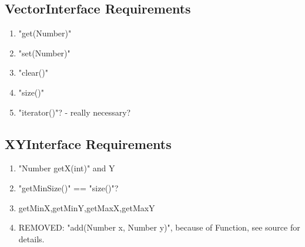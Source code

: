 \documentclass[12pt]{article}
\begin{document}
\subsection{VectorInterface Requirements}
\begin{enumerate}
 \item "get(Number)"
 \item "set(Number)"
 \item "clear()"
 \item "size()"
 \item "iterator()"? - really necessary?
\end{enumerate} 
\subsection{XYInterface Requirements}
\label{xyvector}
\begin{enumerate}
 \item "Number getX(int)" and Y
 \item "getMinSize()" == "size()"?
 \item getMinX,getMinY,getMaxX,getMaxY
 \item REMOVED: "add(Number x, Number y)", because of Function, see source for details.
\end{enumerate}
\end{document}
